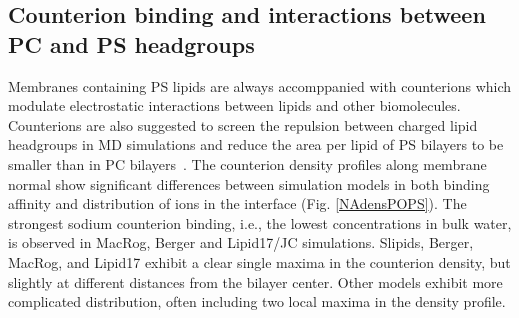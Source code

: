 \documentclass[aps,prl,superscriptaddress,twocolumn]{revtex4}
\begin{document}
%



\subsection{Counterion binding and interactions between PC and PS headgroups}
Membranes containing PS lipids are always accomppanied with counterions which
modulate electrostatic interactions between lipids and other biomolecules. 
Counterions are also suggested to screen the repulsion between charged lipid headgroups 
in MD simulations and reduce the area per lipid of PS bilayers to be smaller than in PC
bilayers~\cite{pandit02,mukhopadhyay04,pedersen06}. 
The counterion density profiles along membrane normal 
show significant differences between simulation models in both binding affinity
and distribution of ions in the interface (Fig. \ref{NAdensPOPS}).
The strongest sodium counterion binding, i.e., the lowest concentrations in bulk water,
is observed in MacRog, Berger and Lipid17/JC simulations.
Slipids, Berger, MacRog, and Lipid17 exhibit a clear single maxima in the
counterion density, but slightly at different distances from the bilayer
center. Other models exhibit more complicated distribution, often including
two local maxima in the density profile.
\end{document}
